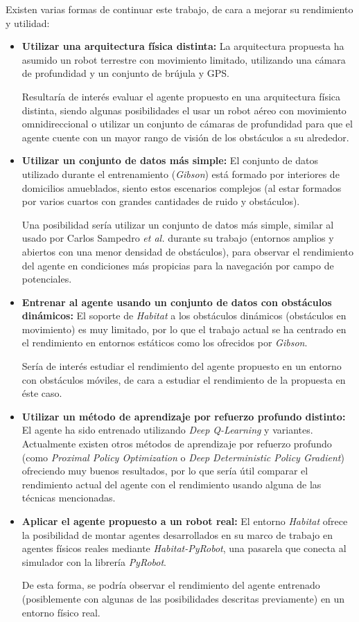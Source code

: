 Existen varias formas de continuar este trabajo, de cara a mejorar su rendimiento y utilidad:
\begin{itemize}
	\item \textbf{Utilizar una arquitectura física distinta:} La arquitectura propuesta ha asumido un robot terrestre con movimiento limitado, utilizando una cámara de profundidad y un conjunto de brújula y GPS.
	
	Resultaría de interés evaluar el agente propuesto en una arquitectura física distinta, siendo algunas posibilidades el usar un robot aéreo con movimiento omnidireccional o utilizar un conjunto de cámaras de profundidad para que el agente cuente con un mayor rango de visión de los obstáculos a su alrededor.
	\item \textbf{Utilizar un conjunto de datos más simple:} El conjunto de datos utilizado durante el entrenamiento (\textit{Gibson}) está formado por interiores de domicilios amueblados, siento estos escenarios complejos (al estar formados por varios cuartos con grandes cantidades de ruido y obstáculos).
	
	Una posibilidad sería utilizar un conjunto de datos más simple, similar al usado por Carlos Sampedro \textit{et al.} \cite{Sampedro2018} durante su trabajo (entornos amplios y abiertos con una menor densidad de obstáculos), para observar el rendimiento del agente en condiciones más propicias para la navegación por campo de potenciales.
	
	\item \textbf{Entrenar al agente usando un conjunto de datos con obstáculos dinámicos:} El soporte de \textit{Habitat} a los obstáculos dinámicos (obstáculos en movimiento) es muy limitado, por lo que el trabajo actual se ha centrado en el rendimiento en entornos estáticos como los ofrecidos por \textit{Gibson}.
	
	Sería de interés estudiar el rendimiento del agente propuesto en un entorno con obstáculos móviles, de cara a estudiar el rendimiento de la propuesta en éste caso.
	
	\item \textbf{Utilizar un método de aprendizaje por refuerzo profundo distinto:} El agente ha sido entrenado utilizando \textit{Deep Q-Learning} y variantes. Actualmente existen otros métodos de aprendizaje por refuerzo profundo (como \textit{Proximal Policy Optimization} o \textit{Deep Deterministic Policy Gradient}) ofreciendo muy buenos resultados, por lo que sería útil comparar el rendimiento actual del agente con el rendimiento usando alguna de las técnicas mencionadas.
	
	\item \textbf{Aplicar el agente propuesto a un robot real:} El entorno \textit{Habitat} ofrece la posibilidad de montar agentes desarrollados en su marco de trabajo en agentes físicos reales mediante \textit{Habitat-PyRobot}, una pasarela que conecta al simulador con la librería \textit{PyRobot}.
	
	De esta forma, se podría observar el rendimiento del agente entrenado (posiblemente con algunas de las posibilidades descritas previamente) en un entorno físico real.
\end{itemize}